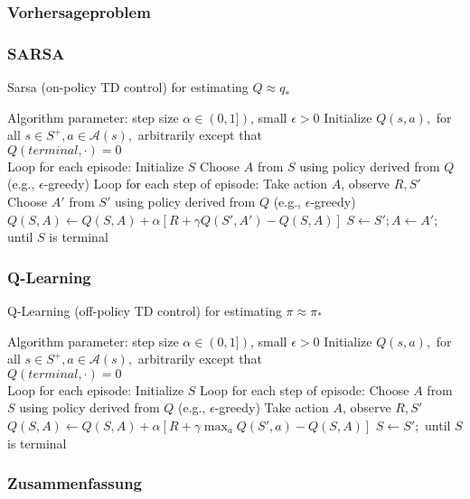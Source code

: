 
\subsubsection{Vorhersageproblem}

\pagebreak
\subsubsection{SARSA}
\begin{algorithm}
    \caption{Sarsa (on-policy TD control) for estimating $Q \approx q_*$}
    \begin{algorithmic}[1]
        \State Algorithm parameter: step size $\alpha \in (0,1])$, small $\epsilon > 0$
        \State Initialize $Q(s,a),$ for all $s \in S^+, a \in \mathcal{A}(s),$ arbitrarily except that \\ $Q(terminal, \mathord{\cdot}) = 0$
        \\
        \State Loop for each episode:
        \Indent
            \State Initialize $S$
            \State Choose $A$ from $S$ using policy derived from $Q$ (e.g., $\epsilon$-greedy)
            \State Loop for each step of episode:
            \Indent
                \State Take action $A$, observe $R, S'$
                \State Choose $A'$ from $S'$ using policy derived from $Q$ (e.g., $\epsilon$-greedy)
                \State $Q(S,A) \gets Q(S,A) + \alpha [R + \gamma Q(S',A') - Q(S,A)]$
                \State $S \gets S'; A \gets A';$
            \EndIndent
            \State until $S$ is terminal
        \EndIndent 
    \end{algorithmic}
\end{algorithm}


\pagebreak
\subsubsection{Q-Learning}
\begin{algorithm}
    \caption{Q-Learning (off-policy TD control) for estimating $\pi \approx \pi_*$}
    \begin{algorithmic}[1]
        \State Algorithm parameter: step size $\alpha \in (0,1])$, small $\epsilon > 0$
        \State Initialize $Q(s,a),$ for all $s \in S^+, a \in \mathcal{A}(s),$ arbitrarily except that \\ $Q(terminal, \mathord{\cdot}) = 0$
        \\
        \State Loop for each episode:
        \Indent
            \State Initialize $S$
            \State Loop for each step of episode:
            \Indent
                \State Choose $A$ from $S$ using policy derived from $Q$ (e.g., $\epsilon$-greedy)
                \State Take action $A$, observe $R, S'$
                \State $Q(S,A) \gets Q(S,A) + \alpha [R + \gamma \max_a Q(S',a) - Q(S,A)]$
                \State $S \gets S';$
            \EndIndent
            \State until $S$ is terminal
        \EndIndent 
    \end{algorithmic}
\end{algorithm}

\subsubsection{Zusammenfassung}
